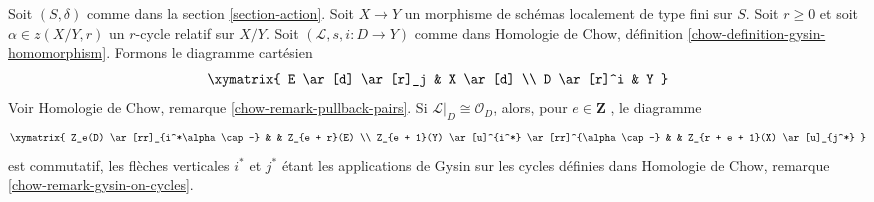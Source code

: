 \begin{lemma} 
\label{lemma-action-gysin} 
Soit $(S, \delta)$ comme dans la section \ref{section-action}. 
Soit $X \to Y$ un morphisme de schémas 
localement de type fini sur $S$. Soit $r \geq 0$ et soit 
$\alpha \in z(X/Y, r)$ un $r$-cycle relatif sur $X/Y$.
 Soit $(\mathcal{L}, s, i : D \to Y)$ comme dans
 Homologie de Chow, définition \ref{chow-definition-gysin-homomorphism}. 
Formons le diagramme cartésien 
$$
\xymatrix{
E \ar[d] \ar[r]_j & X \ar[d] \\
D \ar[r]^i & Y
}
$$
 Voir Homologie de Chow, remarque \ref{chow-remark-pullback-pairs}. 
Si $\mathcal{L}|_D \cong \mathcal{O}_D$, alors, pour $e \in \mathbf{Z}$
 , le diagramme 
$$
\xymatrix{
Z_e(D) \ar[rr]_{i^*\alpha \cap -} & &
Z_{e + r}(E) \\
Z_{e + 1}(Y) \ar[u]^{i^*} \ar[rr]^{\alpha \cap -} & &
Z_{r + e + 1}(X) \ar[u]_{j^*}
}
$$
 est commutatif, les flèches verticales $i^*$ et $j^*$ étant les 
applications de Gysin sur les cycles définies
 dans Homologie de Chow, remarque \ref{chow-remark-gysin-on-cycles}. 
\end{lemma} 

